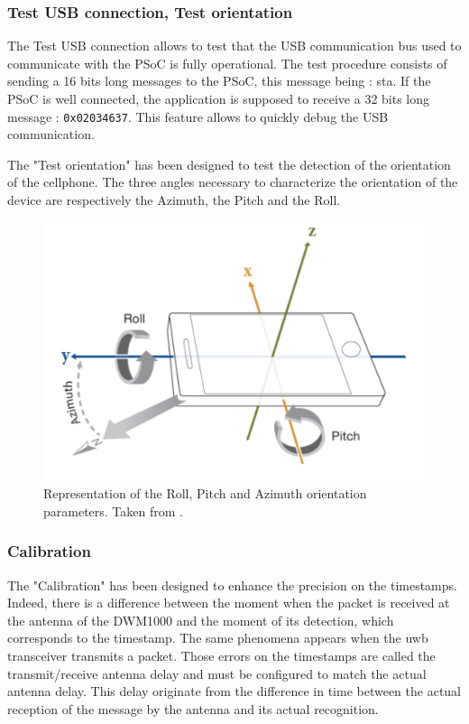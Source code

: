 \subsubsection{Test USB connection, Test orientation}
\label{usb_con}

The Test USB connection allows to test that the USB communication bus used to communicate with the PSoC is fully operational. The test procedure consists of sending a 16 bits long messages to the PSoC, this message being : sta. If the PSoC is well connected, the application is supposed to receive a 32 bits long message : \texttt{0x02034637}. This feature allows to quickly debug the USB communication.
\vspace{2mm}

The "Test orientation" has been designed to test the detection of the orientation of the cellphone. The three angles necessary to characterize the orientation of the device are respectively the Azimuth, the Pitch and the Roll.

\begin{figure}[H]
\centering
\includegraphics[width=.6\linewidth]{Images/angles_gsm.png}
\caption{Representation of the Roll, Pitch and Azimuth orientation parameters. Taken from \cite{mathworks}.}
\end{figure}

\subsubsection{Calibration}

The "Calibration" has been designed to enhance the precision on the timestamps. Indeed, there is a difference between the moment when the packet is received at the antenna of the DWM1000 and the moment of its detection, which corresponds to the timestamp. The same phenomena appears when the \gls{uwb} transceiver transmits a packet. Those errors on the timestamps are called the transmit/receive antenna delay and must be configured to match the actual antenna delay. This delay originate from the difference in time between the actual reception of the message by the antenna and its actual recognition.

